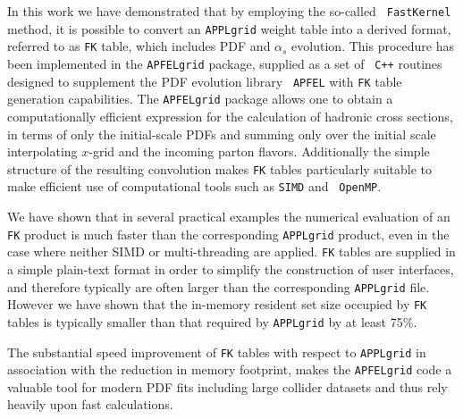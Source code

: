 \documentclass[preprint,12pt]{elsarticle}
\begin{document}
In this work we have demonstrated that by employing the so-called {\tt
  FastKernel} method, it is possible to convert an {\tt APPLgrid}
weight table into a derived format, referred to as {\tt FK} table,
which includes PDF and $\alpha_s$ evolution. This procedure has been
implemented in the {\tt APFELgrid} package, supplied as a set of {\tt
  C++} routines designed to supplement the PDF evolution library {\tt
  APFEL} with {\tt FK} table generation capabilities.
The {\tt APFELgrid} package allows one to obtain a computationally
efficient expression for the calculation of hadronic cross sections,
in terms of only the initial-scale PDFs and summing only over the
initial scale interpolating $x$-grid and the incoming parton
flavors. Additionally the simple structure of the resulting
convolution makes {\tt FK} tables particularly suitable to make
efficient use of computational tools such as {\tt SIMD} and {\tt
  OpenMP}.

We have shown that in several practical examples the numerical
evaluation of an {\tt FK} product is much faster than the
corresponding {\tt APPLgrid} product, even in the case where neither
SIMD or multi-threading are applied. {\tt FK} tables are supplied in a
simple plain-text format in order to simplify the construction of user
interfaces, and therefore typically are often larger than the
corresponding {\tt APPLgrid} file. However we have shown that the
in-memory resident set size occupied by {\tt FK} tables is typically
smaller than that required by {\tt APPLgrid} by at least 75\%.

The substantial speed improvement of {\tt FK} tables with respect to
{\tt APPLgrid} in association with the reduction in memory footprint,
makes the {\tt APFELgrid} code a valuable tool for modern PDF fits
including large collider datasets and thus rely heavily upon fast
calculations.


\end{document}
